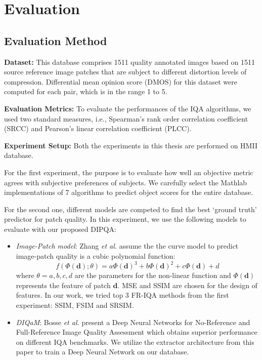 \chapter{Evaluation}

\section{Evaluation Method} 

 
\textbf{Dataset:} 
This database comprises 1511 quality annotated images based on 1511 source reference image patches that are subject to different distortion levels of compression. 
Differential mean opinion score (DMOS) for this dataset were computed for each pair, which is in the range 1 to 5.

\textbf{Evaluation Metrics:}
To evaluate the performances of the IQA algorithms, we used two standard measures, i.e., Spearman's rank order correlation coefficient (SRCC) and Pearson's linear correlation coefficient (PLCC).

\textbf{Experiment Setup:}
Both the experiments in this thesis are performed on HMII database.

For the first experiment, the purpose is to evaluate how well an objective metric agrees with subjective preferences of subjects. We carefully select the Mathlab implementations of 7 algorithms to predict object scores for the entire database. 

For the second one, different models are competed to find the best \enquote*{ground truth} predictor for patch quality. In this experiment, we use the following models to evaluate with our proposed DIPQA:

\begin{itemize}
\item \textit{Image-Patch model}: Zhang \textit{et al.}\cite{Zhang2019} assume the the curve model to predict image-patch quality is a cubic polynomial function:
$$f(\Phi(\textbf{d});\theta) = a\Phi(\textbf{d})^{3} + b\Phi(\textbf{d})^{2} + c\Phi(\textbf{d}) + d$$
where $\theta = {a, b, c, d}$ are the parameters for the non-linear function and $\Phi(\textbf{d})$ represents the feature of patch $\textbf{d}$. MSE and SSIM are chosen for the design of features. In our work, we tried top 3 FR-IQA methods from the first experiment: SSIM, FSIM and SRSIM.  

\item \textit{DIQaM}: Bosse \textit{et al.}\cite{Bosse2018} present a Deep Neural Networks for No-Reference and Full-Reference Image Quality Assessment which obtains superior performance on different IQA benchmarks. We utilize the extractor architecture from this paper to train a Deep Neural Network on our database.
\end{itemize}

